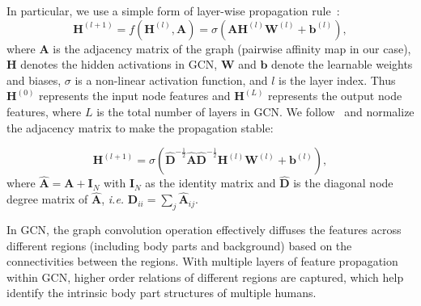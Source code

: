 \documentclass[10pt, letterpaper]{article}
\begin{document}
In particular, we use a simple form of layer-wise propagation rule~\cite{kipf2016semi,manessi2017dynamic}:
\begin{equation}
\mathbf{H}^{(l+1)} =  f(\mathbf{H}^{(l)}, \mathbf{A}) =  \sigma(\mathbf{A}\mathbf{H}^{(l)}\mathbf{W}^{(l)}+\mathbf{b}^{(l)}),
\end{equation}
where $\mathbf{A}$ is the adjacency matrix of the graph (pairwise affinity map in our case), $\mathbf{H}$ denotes the hidden activations in GCN, $\mathbf{W}$ and $\mathbf{b}$ denote the learnable weights and biases, $\sigma$ is a non-linear activation function, and $l$ is the layer index. Thus $\mathbf{H}^{(0)}$ represents the input node features and $\mathbf{H}^{(L)}$ represents the output node features, where $L$ is the total number of layers in GCN. We follow~\cite{kipf2016semi} and normalize the adjacency matrix to make the propagation stable:

\begin{equation}\label{eqn:propagation}
\mathbf{H}^{(l+1)} =  \sigma(\hat{\mathbf{D}}^{-\frac{1}{2}}\hat{\mathbf{A}} \hat{\mathbf{D}}^{-\frac{1}{2}} \mathbf{H}^{(l)}\mathbf{W}^{(l)}+\mathbf{b}^{(l)}),
\end{equation}
where $\hat{\mathbf{A}}=\mathbf{A}+\mathbf{I}_N $ with $\mathbf{I}_N$ as the identity matrix and $\hat{\mathbf{D}}$ is the diagonal node degree matrix of $\hat{\mathbf{A}}$, \emph{i.e.} $\hat{\mathbf{D}}_{ii} = \sum_j\hat{\mathbf{A}}_{ij}$. 

In GCN, the graph convolution operation effectively diffuses the features across different regions (including body parts and background) based on the connectivities between the regions. With multiple layers of feature propagation within GCN,  higher order relations of different regions are captured, which help identify the intrinsic body part structures of multiple humans. 
\end{document}
